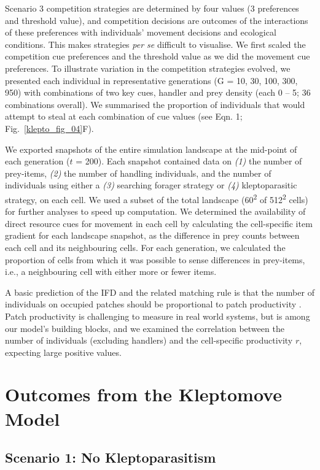 Scenario 3 competition strategies are determined by four values (3 preferences and threshold value), and competition decisions are outcomes of the interactions of these preferences with individuals' movement decisions and ecological conditions.
This makes strategies \textit{per se} difficult to visualise.
We first scaled the competition cue preferences and the threshold value as we did the movement cue preferences.
To illustrate variation in the competition strategies evolved, we presented each individual in representative generations (G = 10, 30, 100, 300, 950) with combinations of two key cues, handler and prey density (each 0 -- 5; 36 combinations overall).
We summarised the proportion of individuals that would attempt to steal at each combination of cue values (see Eqn. 1; Fig.~\ref{klepto_fig_04}F).

We exported snapshots of the entire simulation landscape at the mid-point of each generation ($t$ = 200).
Each snapshot contained data on \textit{(1)} the number of prey-items, \textit{(2)} the number of handling individuals, and the number of individuals using either a \textit{(3)} searching forager strategy or \textit{(4)} kleptoparasitic strategy, on each cell.
We used a subset of the total landscape (60\textsuperscript{2} of 512\textsuperscript{2} cells) for further analyses to speed up computation.
We determined the availability of direct resource cues for movement in each cell by calculating the cell-specific item gradient for each landscape snapshot, as the difference in prey counts between each cell and its neighbouring cells.
For each generation, we calculated the proportion of cells from which it was possible to sense differences in prey-items, i.e., a neighbouring cell with either more or fewer items.

A basic prediction of the IFD and the related matching rule is that the number of individuals on occupied patches should be proportional to patch productivity \parencite{fretwell1970,parker1978,houston2008}.
Patch productivity is challenging to measure in real world systems, but is among our model's building blocks, and we examined the correlation between the number of individuals (excluding handlers) and the cell-specific productivity $r$, expecting large positive values.

\section*{Outcomes from the Kleptomove Model}

\subsection*{Scenario 1: No Kleptoparasitism}

